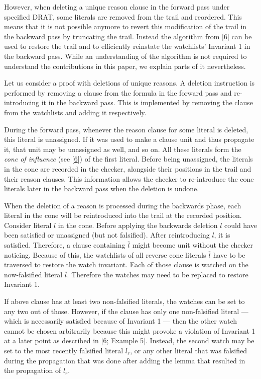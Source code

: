 \documentclass[
]{report}
\begin{document}
 However, when deleting a unique reason clause in the forward pass
under specified DRAT, some literals are removed from the trail and
reordered. This means that it is not possible anymore to revert this
modification of the trail in the backward pass by truncating the trail.
Instead the algorithm from
{[}\protect\hyperlink{ref-RebolaCruz2018}{6}{]} can be used to restore
the trail and to efficiently reinstate the watchlists' Invariant 1 in
the backward pass. While an understanding of the algorithm is not
required to understand the contributions in this paper, we explain parts
of it nevertheless.

Let us consider a proof with deletions of unique reasons. A deletion
instruction is performed by removing a clause from the formula in the
forward pass and re-introducing it in the backward pass. This is
implemented by removing the clause from the watchlists and adding it
respectively.

During the forward pass, whenever the reason clause for some literal is
deleted, this literal is unassigned. If it was used to make a clause
unit and thus propagate it, that unit may be unassigned as well, and so
on. All these literals form the \emph{cone of influence} (see
{[}\protect\hyperlink{ref-RebolaCruz2018}{6}{]}) of the first literal.
Before being unassigned, the literals in the cone are recorded in the
checker, alongside their positions in the trail and their reason
clauses. This information allows the checker to re-introduce the cone
literals later in the backward pass when the deletion is undone.

When the deletion of a reason is processed during the backwards phase,
each literal in the cone will be reintroduced into the trail at the
recorded position. Consider literal \(l\) in the cone. Before applying
the backwards deletion \(l\) could have been satisfied or unassigned
(but not falsified). After reintroducing \(l\), it is satisfied.
Therefore, a clause containing \(\overline{l}\) might become unit
without the checker noticing. Because of this, the watchlists of all
reverse cone literals \(\overline{l}\) have to be traversed to restore
the watch invariant. Each of those clause is watched on the
now-falsified literal \(\overline{l}\). Therefore the watches may need
to be replaced to restore Invariant 1.

If above clause has at least two non-falsified literals, the watches can
be set to any two out of those. However, if the clause has only one
non-falsified literal --- which is necessarily satisfied because of
Invariant 1 --- then the other watch cannot be chosen arbitrarily
because this might provoke a violation of Invariant 1 at a later point
as described in {[}\protect\hyperlink{ref-RebolaCruz2018}{6}; Example
5{]}. Instead, the second watch may be set to the most recently
falsified literal \(l_r\), or any other literal that was falsified
during the propagation that was done after adding the lemma that
resulted in the propagation of \(l_r\). \fi
\end{document}
